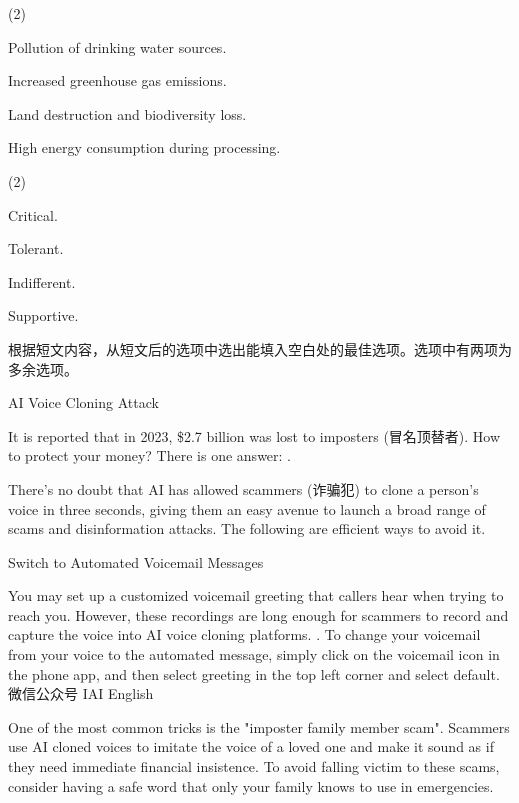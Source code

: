 \documentclass{英语试卷}
\begin{document}
\begin{choices}(2)
  \item Pollution of drinking water sources.
  \item Increased greenhouse gas emissions.
  \item Land destruction and biodiversity loss.
  \item High energy consumption during processing.
\end{choices}
\begin{choices}(2)
  \item Critical.
  \item Tolerant.
  \item Indifferent.
  \item Supportive.
\end{choices}
\par 根据短文内容，从短文后的选项中选出能填入空白处的最佳选项。选项中有两项为多余选项。\par
\par AI Voice Cloning Attack\par
\par It is reported that in 2023, \$2.7 billion was lost to imposters (冒名顶替者). How to protect your money? There is one answer: .\par
\par There's no doubt that AI has allowed scammers (诈骗犯) to clone a person's voice in three seconds, giving them an easy avenue to launch a broad range of scams and disinformation attacks. The following are efficient ways to avoid it.\par
\par Switch to Automated Voicemail Messages\par
\par You may set up a customized voicemail greeting that callers hear when trying to reach you. However, these recordings are long enough for scammers to record and capture the voice into AI voice cloning platforms. . To change your voicemail from your voice to the automated message, simply click on the voicemail icon in the phone app, and then select greeting in the top left corner and select default. 微信公众号 IAI English\par
\par One of the most common tricks is the "imposter family member scam". Scammers use AI cloned voices to imitate the voice of a loved one and make it sound as if they need immediate financial insistence. To avoid falling victim to these scams, consider having a safe word that only your family knows to use in emergencies.\par
\end{document}

